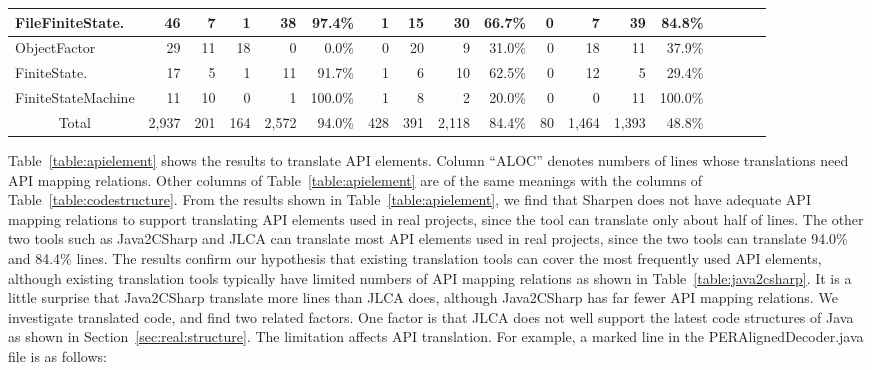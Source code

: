 \begin{table*}[t]
\begin{SmallOut}
\begin {tabular} {|l|r|r|r|r|r|r|r|r|r|r|r|r|r|r|r|r|r|}
\hline
FileFiniteState.& 46   & 7  & 1   & 38  & 97.4\% & 1   & 15 & 30  & 66.7\% & 0  & 7 & 39   & 84.8\%\\
\hline
  ObjectFactor                 & 29   & 11 & 18  & 0   &  0.0\%& 0   & 20  & 9   & 31.0\% & 0  & 18& 11   & 37.9\%\\
\hline
  FiniteState.    & 17   & 5  & 1   & 11  & 91.7\% & 1   & 6  & 10  & 62.5\% & 0  & 12& 5    & 29.4\%\\
\hline
  FiniteStateMachine           & 11   & 10 & 0   & 1   & 100.0\%& 1   & 8  & 2   &  20.0\%& 0  & 0 & 11   & 100.0\%\\
\hline\hline
   \multicolumn{1}{|c|}{Total} & 2,937 & 201& 164 &2,572 &  94.0\%& 428 & 391& 2,118&  84.4\%& 80 &1,464&1,393 & 48.8\%\\
\hline
\end{tabular}%
 \label{table:apielement}
\end{SmallOut}%
\end{table*}

Table~\ref{table:apielement} shows the results to translate API elements. Column ``ALOC'' denotes numbers of lines whose translations need API mapping relations. Other columns of Table~\ref{table:apielement} are of the same meanings with the columns of Table~\ref{table:codestructure}. From the results shown in Table~\ref{table:apielement}, we find that Sharpen does not have adequate API mapping relations to support translating API elements used in real projects, since the tool can translate only about half of lines. The other two tools such as Java2CSharp and JLCA can translate most API elements used in real projects, since the two tools can translate 94.0\% and 84.4\% lines. The results confirm our hypothesis that existing translation tools can cover the most frequently used API elements, although existing translation tools typically have limited numbers of API mapping relations as shown in Table~\ref{table:java2csharp}. It is a little surprise that Java2CSharp translate more lines than JLCA does, although Java2CSharp has far fewer API mapping relations. We investigate translated code, and find two related factors. One factor is that JLCA does not well support the latest code structures of Java as shown in Section~\ref{sec:real:structure}. The limitation affects API translation. For example, a marked line in the PERAlignedDecoder.java file is as follows:

